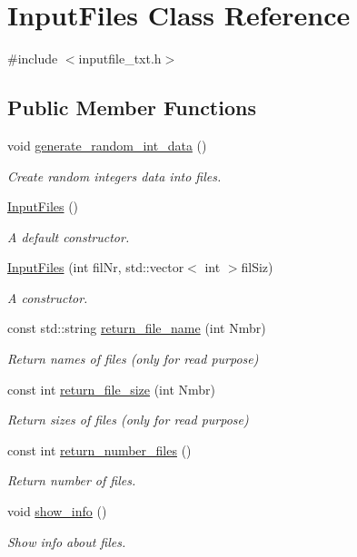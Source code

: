 \hypertarget{class_input_files}{}\section{Input\+Files Class Reference}
\label{class_input_files}


{\ttfamily \#include $<$inputfile\+\_\+txt.\+h$>$}

\subsection*{Public Member Functions}
\begin{DoxyCompactItemize}
\item 
void \hyperlink{class_input_files_ae5bb1d7ff253b873327a3a3d84f64584}{generate\+\_\+random\+\_\+int\+\_\+data} ()
\begin{DoxyCompactList}\small\item\em Create random integers data into files. \end{DoxyCompactList}\item 
\hyperlink{class_input_files_a85a092f7ad25a9f959f1a93e5afb2045}{Input\+Files} ()
\begin{DoxyCompactList}\small\item\em A default constructor. \end{DoxyCompactList}\item 
\hyperlink{class_input_files_a500e1a86787be57b9525836c6c912311}{Input\+Files} (int fil\+Nr, std\+::vector$<$ int $>$fil\+Siz)
\begin{DoxyCompactList}\small\item\em A constructor. \end{DoxyCompactList}\item 
const std\+::string \hyperlink{class_input_files_a9867703917e916ceea50b9d7d4b07d2f}{return\+\_\+file\+\_\+name} (int Nmbr)
\begin{DoxyCompactList}\small\item\em Return names of files (only for read purpose) \end{DoxyCompactList}\item 
const int \hyperlink{class_input_files_ad0bb8456352c7e008315a284d9003086}{return\+\_\+file\+\_\+size} (int Nmbr)
\begin{DoxyCompactList}\small\item\em Return sizes of files (only for read purpose) \end{DoxyCompactList}\item 
const int \hyperlink{class_input_files_a5b1547e90d17d2332daed2203939ce25}{return\+\_\+number\+\_\+files} ()
\begin{DoxyCompactList}\small\item\em Return number of files. \end{DoxyCompactList}\item 
void \hyperlink{class_input_files_adacb161e743183a2acef22b26dc7b954}{show\+\_\+info} ()
\begin{DoxyCompactList}\small\item\em Show info about files. \end{DoxyCompactList}\end{DoxyCompactItemize}
